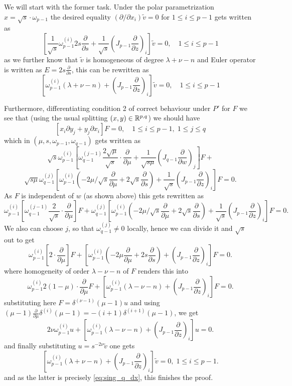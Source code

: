 \documentclass[10pt]{article} %
\theoremstyle{definition}
\theoremstyle{remark}
\begin{document}
\begin{myproof}
	We will start with the former task. Under the polar parametrization $x=\sqrt{s}
	\cdot \omega_{p-1}$ the desired equality $(\partial/\partial x_i)\tilde{v}=0$ for $1\leq i\leq p-1$
	gets written as \[ \left[ \frac{1}{\sqrt{s}}\omega_{p-1}^{(i)}2s\frac{\partial}{\partial s}
	+\frac{1}{\sqrt{s}}\left( J_{p-1}\frac{\partial}{\partial z} \right)_{i}\right]\tilde{v}=0,\quad 1\leq i\leq p-1\]
	as we further know that $\tilde{v}$ is homogeneous of degree $\lambda+\nu-n$ and Euler operator is written as $E=2s\frac{
	\partial}{\partial s}$, this can be rewritten as
	\begin{equation}
	\left[ \omega_{p-1}^{(i)}(\lambda+\nu-n)
		+\left( J_{p-1}\frac{\partial}{\partial z} \right)_{i}\right]\tilde{v}=0,\quad 1\leq i\leq p-1
		\label{eq:sing_q_dx}
	\end{equation}

	Furthermore, differentiating condition 2 of correct behaviour under $P'$ for $F$ we see that (using the usual
	splitting $(x,y)\in\mathbb{R}^{p,q}$) we should have
	\[ \left[ x_i\partial y_j + y_j\partial x_i \right]F=0,\quad 1\le i\le p-1,\;1\leq j\leq q\]
	which in $(\mu,s,\omega_{p-1},\omega_{q-1})$ gets written as
	\[ \sqrt{s}\omega^{(i)}_{p-1}\left[ \omega^{(j-1)}_{q-1}\frac{2\sqrt{\mu}}{\sqrt{s}}\cdot\frac{\partial}{\partial\mu}+
	\frac{1}{\sqrt{s\mu}}\left( J_{q-1}\frac{\partial}{\partial w} \right)_j\right]F+\]\[
	\sqrt{s\mu}\omega^{(j)}_{q-1}\left[ \omega_{p-1}^{(i)}\left( -2\mu/\sqrt{s}\frac{\partial}{\partial\mu}+2\sqrt{s}\frac
	{\partial}{\partial s} \right)+\frac{1}{\sqrt{s}}\left( J_{p-1}\frac{\partial}{\partial z} \right)_i \right]F=0.\]
	As $F$ is independent of $w$ (as shown above) this gets rewritten as
	\[ \omega^{(i)}_{p-1}\left[ \omega^{(j-1)}_{q-1}\frac{2}{\sqrt{s}}\cdot\frac{\partial}{\partial\mu}
	\right]F+
	\omega^{(j)}_{q-1}\left[ \omega_{p-1}^{(i)}\left( -2\mu/\sqrt{s}\frac{\partial}{\partial\mu}+2\sqrt{s}\frac
	{\partial}{\partial s} \right)+\frac{1}{\sqrt{s}}\left( J_{p-1}\frac{\partial}{\partial z} \right)_i \right]F=0.\]
	We also can choose $j$, so that $\omega^{(j)}_{q-1}\neq0$ locally, hence we can divide it and $\sqrt{s}$ out to get
	\[ \omega^{(i)}_{p-1}\left[ {2}\cdot\frac{\partial}{\partial\mu}
	\right]F+
	\left[ \omega_{p-1}^{(i)}\left( -2\mu\frac{\partial}{\partial\mu}+2{s}\frac
	{\partial}{\partial s} \right)+\left( J_{p-1}\frac{\partial}{\partial z} \right)_i \right]F=0.\]
	where homogeneity of order $\lambda-\nu-n$
	of $F$ renders this into
	\[ \omega^{(i)}_{p-1} {2}(1-\mu)\cdot\frac{\partial}{\partial\mu}F+
	\left[ \omega_{p-1}^{(i)}\left( \lambda-\nu-n
	\right)+\left( J_{p-1}\frac{\partial}{\partial z} \right)_i \right]F=0.\]
	substituting here $F=\delta^{(\nu-1)}(\mu-1)u$ and using $(\mu-1)\frac{\partial}{\partial\mu}\delta^{(i)}(\mu-1)=
	-(i+1)\delta^{(i+1)}(\mu-1)$, we get
	\[ 2\nu\omega^{(i)}_{p-1}u+\left[ \omega_{p-1}^{(i)}\left( \lambda-\nu-n
	\right)+\left( J_{p-1}\frac{\partial}{\partial z} \right)_i \right]u=0.\]
	and finally substituting $u=s^{-2\nu}\tilde{v}$ one gets
	\[ \left[ \omega_{p-1}^{(i)}\left( \lambda+\nu-n
	\right)+\left( J_{p-1}\frac{\partial}{\partial z} \right)_i \right]\tilde{v}=0,\;1\leq i\leq p-1.\]
	and as the latter is precisely \eqref{eq:sing_q_dx}, this finishes the proof.
\end{myproof}


\end{document}
